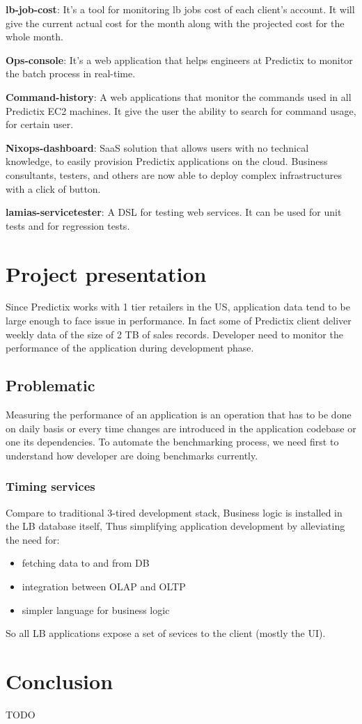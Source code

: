 \textbf{lb-job-cost}: It's a tool for monitoring lb jobs cost of each client's account.
It will give the current actual cost for the month along with the projected cost
for the whole month.

\textbf{Ops-console}: It's a web application that helps engineers at Predictix to monitor
the batch process in real-time.

\textbf{Command-history}: A web applications that monitor the commands used in all
Predictix EC2 machines. It give the user the ability to search for command
usage, for certain user.

\textbf{Nixops-dashboard}:
SaaS solution that allows users with no technical knowledge, to easily provision
Predictix applications on the cloud.  Business consultants, testers, and others are
now able to deploy complex infrastructures with a click of button.

\textbf{lamias-servicetester}: A DSL for testing web services. It can be used for unit
tests and for regression tests.

\section{Project presentation}

Since Predictix works with 1 tier retailers in the US, application data tend to
be large enough to face issue in performance. In fact some of Predictix client
deliver weekly data of the size of 2 TB of sales records. 
Developer need to monitor the performance of the application during development
phase.

\subsection{Problematic}
Measuring the performance of an application is an operation that has to be done on
daily basis or every time changes are introduced in the application codebase or
one its dependencies.
To automate the benchmarking process, we need first to understand how developer
are doing benchmarks currently.

\subsubsection{Timing services}
Compare to traditional 3-tired development stack, Business logic is installed in
the LB database itself, Thus simplifying  application development by alleviating
the need for:
\begin{itemize}
\item{fetching data to and from DB }
\item{integration between OLAP and OLTP}
\item{simpler language for business logic}
\end{itemize}
So all LB applications expose a set of sevices to the client (mostly the UI).

\section*{Conclusion}
TODO
